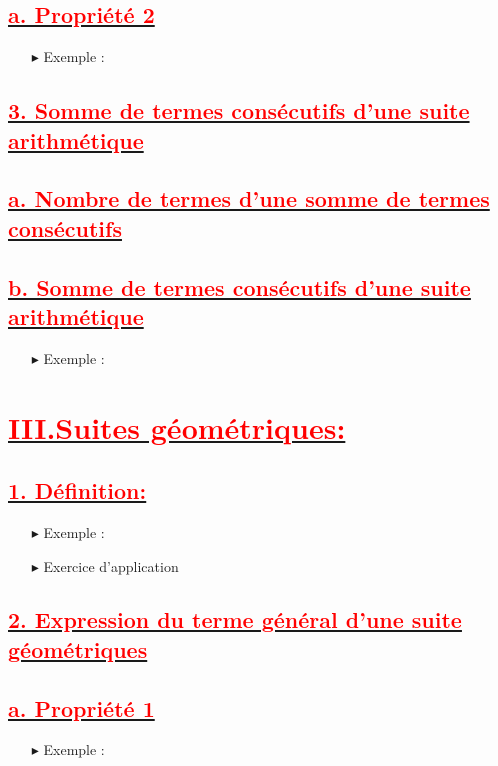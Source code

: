 \documentclass[12pt]{article}
\begin{document}
\subsection*{\underline{\textbf{\textcolor{red}{a. Propriété 2}}}}
\begin{itemize}
\item[$\blacktriangleright$] Exemple :
\end{itemize}
\subsection*{\underline{\textbf{\textcolor{red}{3. Somme de termes consécutifs d’une suite arithmétique}}}}
\subsection*{\underline{\textbf{\textcolor{red}{a. Nombre de termes d’une somme de termes consécutifs}}}}
\subsection*{\underline{\textbf{\textcolor{red}{b. Somme de termes consécutifs d’une suite arithmétique}}}}
\begin{itemize}
\item[$\blacktriangleright$] Exemple :
\end{itemize}


\section*{\underline{\textbf{\textcolor{red}{III.Suites géométriques:}}}}
\subsection*{\underline{\textbf{\textcolor{red}{1. Définition:}}}}
\begin{itemize}
\item[$\blacktriangleright$] Exemple :
\item[$\blacktriangleright$] Exercice d’application
\end{itemize}
\subsection*{\underline{\textbf{\textcolor{red}{2. Expression du terme général d’une suite géométriques}}}}
\subsection*{\underline{\textbf{\textcolor{red}{a. Propriété 1}}}}
\begin{itemize}
\item[$\blacktriangleright$] Exemple :
\end{itemize}
\end{document}

